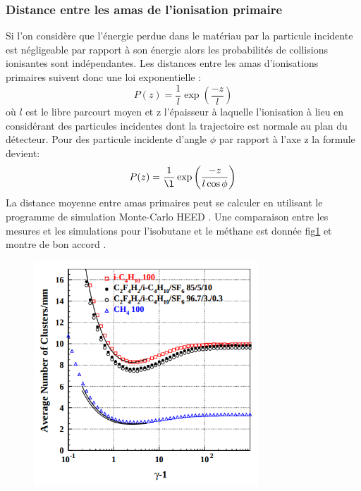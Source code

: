 \subsubsection{Distance entre les amas de l'ionisation primaire}
Si l'on considère que l'énergie perdue dans le matériau par la particule incidente est négligeable par rapport à son énergie alors les probabilités de collisions ionisantes sont indépendantes. Les distances entre les amas d'ionisations primaires suivent donc une loi exponentielle :
\begin{equation}
P(z)=\frac{1}{l}\exp\left(\frac{-z}{l}\right)
\end{equation} 
où $l$ est le libre parcourt moyen et z l'épaisseur à laquelle l'ionisation à lieu en considérant des particules incidentes dont la trajectoire est normale au plan du détecteur. Pour des particule incidente d'angle $\phi$ par rapport à l'axe z la formule devient:
\begin{equation}
P(z)=\frac{1}{\l}\exp\left(\frac{-z}{l\cos\phi}\right)
\end{equation}
La distance moyenne entre amas primaires peut se calculer en utilisant le programme de simulation Monte-Carlo HEED \cite{HEED}. Une comparaison entre les mesures et les simulations pour l'isobutane et le méthane est donnée fig\ref{lambda} et montre de bon accord \cite{2004NIMPA}.  
\begin{figure}[h!]
	\centering
	\includegraphics[width=0.75\textwidth]{RPC/lambda.png}
	\label{lambda}
\end{figure}

